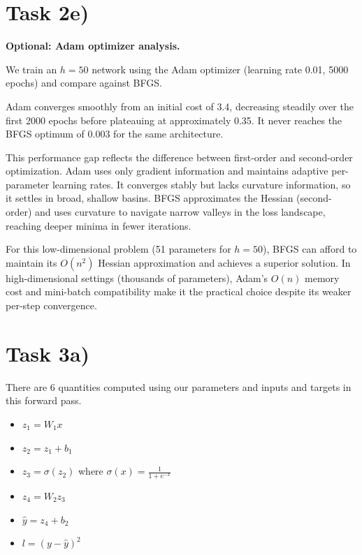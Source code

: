 \documentclass[a4paper,oneside,bibliography=totoc]{scrartcl}
\begin{document}
\section*{Task 2e)}
\begin{answer}[18cm]
  \textbf{Optional: Adam optimizer analysis.}

  We train an $h{=}50$ network using the Adam optimizer (learning rate 0.01, 5000 epochs) and compare against BFGS.

  Adam converges smoothly from an initial cost of 3.4, decreasing steadily over the first 2000 epochs before plateauing at approximately 0.35. It never reaches the BFGS optimum of 0.003 for the same architecture.

  This performance gap reflects the difference between first-order and second-order optimization. Adam uses only gradient information and maintains adaptive per-parameter learning rates. It converges stably but lacks curvature information, so it settles in broad, shallow basins. BFGS approximates the Hessian (second-order) and uses curvature to navigate narrow valleys in the loss landscape, reaching deeper minima in fewer iterations.

  For this low-dimensional problem (51 parameters for $h{=}50$), BFGS can afford to maintain its $O(n^2)$ Hessian approximation and achieves a superior solution. In high-dimensional settings (thousands of parameters), Adam's $O(n)$ memory cost and mini-batch compatibility make it the practical choice despite its weaker per-step convergence.
\end{answer}

\section*{Task 3a)}
\begin{answer}
  There are 6 quantities computed using our parameters and inputs and targets in this forward pass.
  \begin{itemize}
    \item $z_{1} = W_{1}x$
    \item $z_{2} = z_{1} + b_{1}$
    \item $z_{3} = \sigma(z_{2})$ where $\sigma(x) = \frac{1}{1 + e^{-x}}$
    \item $z_{4} = W_{2}z_{3}$
    \item $\hat{y} = z_{4} + b_{2}$
    \item $l = (y- \hat{y})^{2}$
  \end{itemize}
\end{answer}
\end{document}
